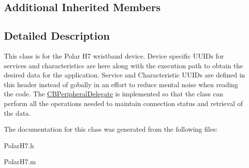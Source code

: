 \subsection*{Additional Inherited Members}


\subsection{Detailed Description}
This class is for the Polar H7 wristband device. Device specific U\-U\-I\-Ds for services and characteristics are here along with the execution path to obtain the desired data for the application. Service and Characteristic U\-U\-I\-Ds are defined in this header instead of gobally in an effort to reduce mental noise when reading the code. The \hyperlink{class_c_b_peripheral_delegate-p}{C\-B\-Peripheral\-Delegate} is implemented so that the class can perform all the operations needed to maintain connection status and retrieval of the data. 

The documentation for this class was generated from the following files\-:\begin{DoxyCompactItemize}
\item 
Polar\-H7.\-h\item 
Polar\-H7.\-m\end{DoxyCompactItemize}
